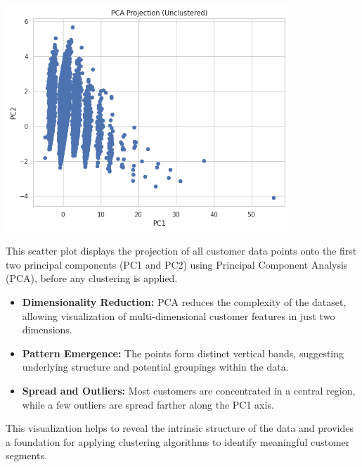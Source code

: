 \documentclass[a4paper]{article}
\begin{document}
\begin{multicols}{2}
\noindent
\begin{minipage}{\columnwidth}
\centering
\includegraphics[width=0.8\textwidth]{plots/PCA Projection (Unclustered).png}
\label{fig:pca_unclustered}
\end{minipage}

This scatter plot displays the projection of all customer data points onto the first two principal components (PC1 and PC2) using Principal Component Analysis (PCA), before any clustering is applied.

\begin{itemize}
    \item \textbf{Dimensionality Reduction:} PCA reduces the complexity of the dataset, allowing visualization of multi-dimensional customer features in just two dimensions.
    \item \textbf{Pattern Emergence:} The points form distinct vertical bands, suggesting underlying structure and potential groupings within the data.
    \item \textbf{Spread and Outliers:} Most customers are concentrated in a central region, while a few outliers are spread farther along the PC1 axis.
\end{itemize}

This visualization helps to reveal the intrinsic structure of the data and provides a foundation for applying clustering algorithms to identify meaningful customer segments.

\vspace{1em}


\end{multicols}
\end{document}
